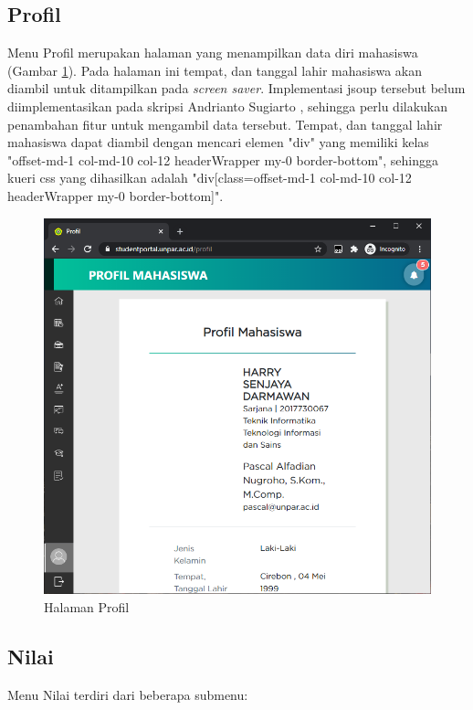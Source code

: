 \subsection{Profil}
    Menu Profil merupakan halaman yang menampilkan data diri mahasiswa (Gambar \ref{fig:3_profil}). Pada halaman ini tempat, dan tanggal lahir mahasiswa akan diambil untuk ditampilkan pada \textit{screen saver}. Implementasi jsoup tersebut belum diimplementasikan pada skripsi Andrianto Sugiarto \cite{ifstupor}, sehingga perlu dilakukan penambahan fitur untuk mengambil data tersebut. Tempat, dan tanggal lahir mahasiswa dapat diambil dengan mencari elemen "div" yang memiliki kelas "offset-md-1 col-md-10 col-12 headerWrapper my-0 border-bottom", sehingga kueri css yang dihasilkan adalah "div[class=offset-md-1 col-md-10 col-12 headerWrapper my-0 border-bottom]".
    \begin{figure}[H]
    	\centering
    	\includegraphics[scale=0.45]{Gambar/profil.png}
    	\caption{Halaman Profil} 
    	\label{fig:3_profil}
    \end{figure}
    
\subsection{Nilai}
    Menu Nilai terdiri dari beberapa submenu:
    
